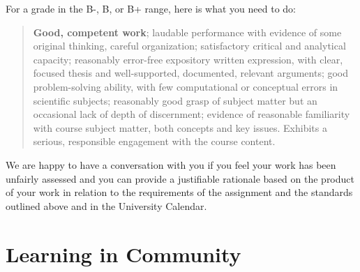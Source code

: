 \documentclass[
]{book}
\begin{document}
For a grade in the B-, B, or B+ range, here is what you need to do:

\begin{quote}
\textbf{Good, competent work}; laudable performance with evidence of some original thinking, careful organization; satisfactory critical and analytical capacity; reasonably error-free expository written expression, with clear, focused thesis and well-supported, documented, relevant arguments; good problem-solving ability, with few computational or conceptual errors in scientific subjects; reasonably good grasp of subject matter but an occasional lack of depth of discernment; evidence of reasonable familiarity with course subject matter, both concepts and key issues. Exhibits a serious, responsible engagement with the course content.
\end{quote}

We are happy to have a conversation with you if you feel your work has been unfairly assessed and you can provide a justifiable rationale based on the product of your work in relation to the requirements of the assignment and the standards outlined above and in the University Calendar.

\hypertarget{learning-in-community}{%
\chapter{Learning in Community}\label{learning-in-community}}
\end{document}
